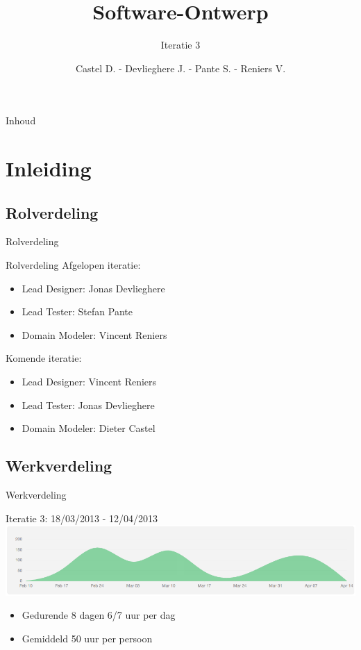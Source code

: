\documentclass[t]{beamer}
\title{Software-Ontwerp}
\subtitle{Iteratie 3}
\author{Castel D. - Devlieghere J. - Pante S. - Reniers V.}
\institute{KU Leuven}
\begin{document}
\frame{\titlepage} 
\begin{frame}{Inhoud}
\begin{multicols}{2}
\tableofcontents
\end{multicols}
\end{frame}



\section{Inleiding} 

\subsection{Rolverdeling}

\begin{frame}{Rolverdeling}
\begin{multicols}{2}
\tableofcontents[currentsection]
\end{multicols}
\end{frame}

\begin{frame}{Rolverdeling}
Afgelopen iteratie:
\begin{itemize}
	\item Lead Designer: Jonas Devlieghere
	\item Lead Tester: Stefan Pante
	\item Domain Modeler: Vincent Reniers
\end{itemize}
Komende iteratie:
\begin{itemize}
	\item Lead Designer: Vincent Reniers
	\item Lead Tester: Jonas Devlieghere
	\item Domain Modeler: Dieter Castel
\end{itemize}
\end{frame}

\subsection{Werkverdeling}

\begin{frame}{Werkverdeling}
\begin{center}
Iteratie 3: 18/03/2013 - 12/04/2013
\includegraphics[width= 0.9\linewidth]{images/workload}
\end{center}
\begin{itemize}
	\item Gedurende 8 dagen 6/7 uur per dag
	\item Gemiddeld 50 uur per persoon
\end{itemize}

\end{frame}
\end{document}
